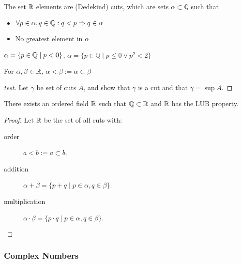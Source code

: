 \begin{definition}
	The set $\mathbb{R}$ elements are (Dedekind) cuts, which are sets $\alpha\subset\mathbb{Q}$ such that
	\begin{itemize}
		\item $\forall p\in  \alpha, q \in \mathbb{Q}:q<p \Rightarrow q \in \alpha$
		\item No greatest element in $\alpha$
	\end{itemize}
	\begin{example}
		$\alpha=\{p \in \mathbb{Q} \mid p < 0 \} $, $\alpha=\{ {p\in\mathbb{Q}\mid p\leq0\lor p^2<2}\}$
	\end{example}
\end{definition}

\begin{definition}
	For $\alpha,\beta \in \mathbb{R}$, $\alpha<\beta:=\alpha\subset\beta$
\end{definition}
\begin{proof}[test]
	Let $\gamma$ be set of cuts $A$, and show that $\gamma$ is a cut and that $\gamma=\sup A$.
\end{proof}

\begin{theorem}
	There exists an ordered field $\mathbb{R} $ such that $\mathbb{Q} \subset \mathbb{R}$ and $\mathbb{R}$ has the LUB property.
	\begin{proof}
		Let $\mathbb{R}$ be the set of all cuts with:
		\begin{description}
			\item[order] $a<b:=a \subset b$.
			\item[addition] $\alpha+\beta=\{p+q\mid p\in \alpha, q\in \beta\}$.
			\item [multiplication] $\alpha\cdot\beta=\{p\cdot q\mid p\in \alpha, q\in \beta\}$.
		\end{description}
	\end{proof}
\end{theorem}

\subsubsection{Complex Numbers}

